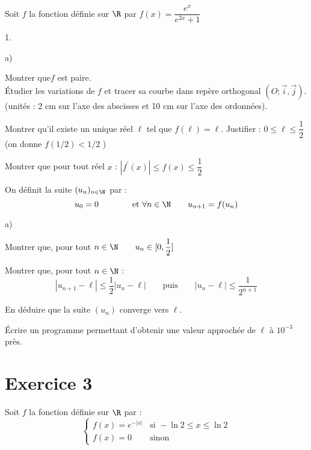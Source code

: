 \documentclass[11pt]{article}%
\begin{document}
\noindent Soit $f$ la fonction définie sur $\R$ par $f(x) =
\dfrac{e^{x}}{e^{2x} + 1}$

\begin{noliste}{1.}
 \setlength{\itemsep}{4mm}
\item 
\begin{noliste}{a)}
 \setlength{\itemsep}{2mm}
\item Montrer que$f$ est paire.\\
Étudier les variations de $f$ et tracer sa courbe dans repère
orthogonal 
$(O;\vec{i},\vec{j})$.\\
(unités : 2 cm sur l'axe des abscisses et 10 cm sur l'axe des
ordonnées).

\item Montrer qu'il existe un unique réel $\ell $ tel que $f(\ell
) = \ell $. Justifier : $0\leq \ell \leq \dfrac{1}{2}$ (on donne
$f\left(
1/2\right) <1/2$ )

\item Montrer que pour tout réel $x$ : $|f^{\prime }(x)|\leq f(x)\leq 
\dfrac{1}{2}$
\end{noliste}

\item On définit la suite $(u_{n})_{n\in \N}$ par : 
\[
u_{0} = 0\qquad \qquad \text{et }\forall n\in \N\qquad u_{n + 1} =
f(u_{n})
\]

\begin{noliste}{a)}
 \setlength{\itemsep}{2mm}
\item Montrer que, pour tout $n\in \N\qquad u_{n}\in [0,\dfrac{1}{2}]$

\item Montrer que, pour tout $n\in \N$ : 
\[
|u_{n + 1}-\ell |\leq \dfrac{1}{2}|u_{n}-\ell |\qquad \text{puis}\qquad
|u_{n}-\ell |\leq \dfrac{1}{2^{n + 1}}
\]

\item En déduire que la suite $(u_{n})$ converge vers $\ell $.

\item Écrire un programme \Scilab{} permettant d'obtenir une valeur
approchée de $\ell $ à $10^{-3}$ près.
\end{noliste}
\end{noliste}

\section*{Exercice 3}

\noindent Soit $f$ la fonction définie sur $\R$ par : 
\[
\left\{ 
\begin{array}{ll}
f(x) = e^{-|x|} & \text{si }-\ln 2\leq x\leq \ln 2 \\
f(x) = 0 & \text{sinon}
\end{array}
\right. 
\]
\end{document}
